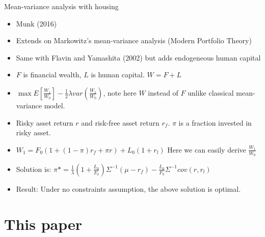 \documentclass{beamer}
\begin{document}
\begin{frame}[allowframebreaks]{Mean-variance analysis with housing}
  \begin{itemize}
    \item Munk (2016)
    \item Extends on Markowitz's mean-variance analysis (Modern Portfolio Theory)
    \item Same with Flavin and Yamashita (2002) but adds endogeneous human capital
    \item $F$ is financial wealth, $L$ is human capital. $W = F+L$
    \item $\max E[\frac{W_1}{W_0}] - \frac{1}{2}\lambda var(\frac{W_1}{W_0})$, note here $W$ instead of $F$ unlike classical mean-variance model.

\framebreak

    \item Risky asset return $r$ and risk-free asset return $r_f$. $\pi$ is a fraction invested in risky asset.
    \item $W_1 = F_0(1+(1-\pi)r_f+\pi r) + L_0(1+r_l)$ Here we can easily derive $\frac{W_1}{W_0}$
    \item Solution is: $\pi* = \frac{1}{\lambda}(1+\frac{L_0}{F_0})\Sigma^{-1}(\mu-r_f)-\frac{L_0}{F_0}\Sigma^{-1}cov(r, r_l)$
    \item Result: Under no constraints assumption, the above solution is optimal.
  \end{itemize}
\end{frame}

\section{This paper}
\end{document}

